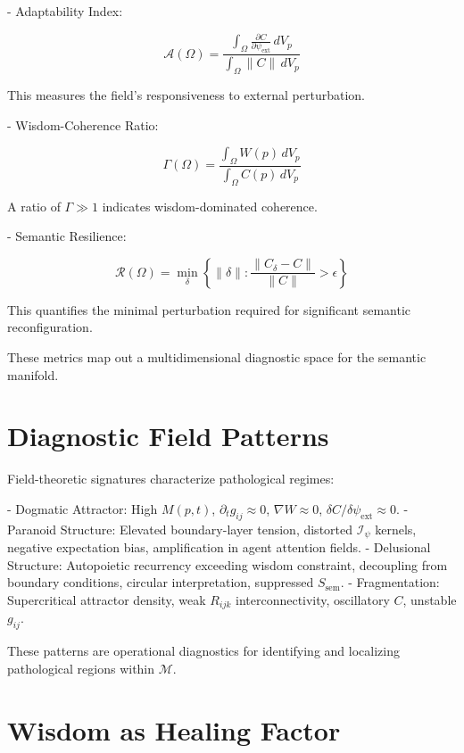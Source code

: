 - Adaptability Index:

\begin{equation}
\mathcal{A}(\Omega) = \frac{\int_{\Omega} \frac{\partial C}{\partial \psi_{\text{ext}}} \, dV_p}{\int_{\Omega} \|C\| \, dV_p}
\end{equation}

This measures the field's responsiveness to external perturbation.

- Wisdom-Coherence Ratio:

\begin{equation}
\Gamma(\Omega) = \frac{\int_{\Omega} W(p) \, dV_p}{\int_{\Omega} C(p) \, dV_p}
\end{equation}

A ratio of $\Gamma \gg 1$ indicates wisdom-dominated coherence.

- Semantic Resilience:

\begin{equation}
\mathcal{R}(\Omega) = \min_{\delta} \left\{\|\delta\| : \frac{\|C_{\delta} - C\|}{\|C\|} > \epsilon\right\}
\end{equation}

This quantifies the minimal perturbation required for significant semantic reconfiguration.

These metrics map out a multidimensional diagnostic space for the semantic manifold.

\section{Diagnostic Field Patterns}

Field-theoretic signatures characterize pathological regimes:

- Dogmatic Attractor: High $M(p,t)$, $\partial_t g_{ij} \approx 0$, $\nabla W \approx 0$, $\delta C / \delta \psi_{\text{ext}} \approx 0$.
- Paranoid Structure: Elevated boundary-layer tension, distorted $\mathcal{I}_{\psi}$ kernels, negative expectation bias, amplification in agent attention fields.
- Delusional Structure: Autopoietic recurrency exceeding wisdom constraint, decoupling from boundary conditions, circular interpretation, suppressed $S_{\text{sem}}$.
- Fragmentation: Supercritical attractor density, weak $R_{ijk}$ interconnectivity, oscillatory $C$, unstable $g_{ij}$.

These patterns are operational diagnostics for identifying and localizing pathological regions within $\mathcal{M}$.

\section{Wisdom as Healing Factor}

